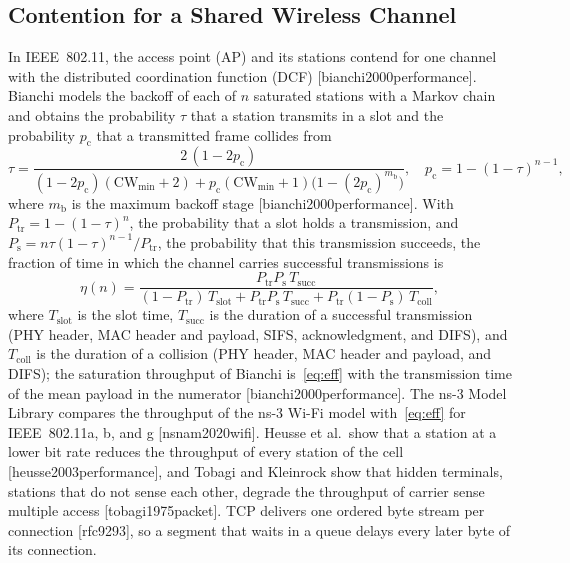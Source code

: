\subsection{Contention for a Shared Wireless Channel}\label{subsec:cong}
In IEEE~802.11, the access point (AP) and its stations contend for one channel with the distributed coordination function (DCF) [bianchi2000performance]. Bianchi models the backoff of each of $n$ saturated stations with a Markov chain and obtains the probability $\tau$ that a station transmits in a slot and the probability $p_{\mathrm{c}}$ that a transmitted frame collides from
\begin{equation}
\tau = \frac{2\,(1 - 2p_{\mathrm{c}})}{(1 - 2p_{\mathrm{c}})(\mathrm{CW}_{\min} + 2) + p_{\mathrm{c}} (\mathrm{CW}_{\min} + 1) \big(1 - (2p_{\mathrm{c}})^{m_{\mathrm{b}}}\big)}, \quad p_{\mathrm{c}} = 1 - (1 - \tau)^{n-1},
\label{eq:bianchi}
\end{equation}
where $m_{\mathrm{b}}$ is the maximum backoff stage [bianchi2000performance]. With $P_{\mathrm{tr}} = 1 - (1 - \tau)^n$, the probability that a slot holds a transmission, and $P_{\mathrm{s}} = n\tau(1-\tau)^{n-1}/P_{\mathrm{tr}}$, the probability that this transmission succeeds, the fraction of time in which the channel carries successful transmissions is
\begin{equation}
\eta(n) = \frac{P_{\mathrm{tr}} P_{\mathrm{s}}\, T_{\mathrm{succ}}}{(1 - P_{\mathrm{tr}})\,T_{\mathrm{slot}} + P_{\mathrm{tr}} P_{\mathrm{s}}\, T_{\mathrm{succ}} + P_{\mathrm{tr}}(1 - P_{\mathrm{s}})\, T_{\mathrm{coll}}},
\label{eq:eff}
\end{equation}
where $T_{\mathrm{slot}}$ is the slot time, $T_{\mathrm{succ}}$ is the duration of a successful transmission (PHY header, MAC header and payload, SIFS, acknowledgment, and DIFS), and $T_{\mathrm{coll}}$ is the duration of a collision (PHY header, MAC header and payload, and DIFS); the saturation throughput of Bianchi is~\eqref{eq:eff} with the transmission time of the mean payload in the numerator [bianchi2000performance]. The ns-3 Model Library compares the throughput of the ns-3 Wi-Fi model with~\eqref{eq:eff} for IEEE~802.11a, b, and g [nsnam2020wifi]. Heusse et al.\ show that a station at a lower bit rate reduces the throughput of every station of the cell [heusse2003performance], and Tobagi and Kleinrock show that hidden terminals, stations that do not sense each other, degrade the throughput of carrier sense multiple access [tobagi1975packet]. TCP delivers one ordered byte stream per connection [rfc9293], so a segment that waits in a queue delays every later byte of its connection.

